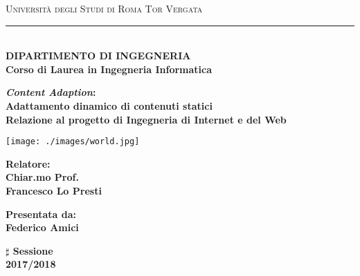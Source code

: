 \documentclass[paper=a4, oneside, fontsize=14pt, titlepage]{article}
\begin{document}
	\begin{titlepage}
		\begin{center}
			{{\Large{\textsc{Università degli Studi di Roma Tor Vergata}}}} \rule[0.1cm]{5.8cm}{0.5mm}\\
			{\small{\bf DIPARTIMENTO DI INGEGNERIA\\Corso di Laurea in Ingegneria Informatica}}
		\end{center}
		\vspace{15mm}
		\begin{center}
			{\LARGE{\bf\textit{ Content Adaption}:}}\\
			\vspace{3mm}
			{\LARGE{\bf Adattamento dinamico di contenuti statici}}\\
			\vspace{19mm} {\large{\bf Relazione al progetto di Ingegneria di Internet e del Web}}
		\end{center}
		\vspace{10mm}
		\begin{center}
			\texttt{[image: ./images/world.jpg]}
		\end{center}
		\vspace{10mm}
		\par
		\noindent
		\begin{minipage}[t]{0.47\textwidth}
			{\large{\bf Relatore:\\
					Chiar.mo Prof.\\
					Francesco Lo Presti}}
		\end{minipage}
		\hfill
		\begin{minipage}[t]{0.47\textwidth}\raggedleft
			{\large{\bf Presentata da:\\
					Federico Amici}}
		\end{minipage}
		\vspace{20mm}
		\begin{center}
			{\large{\bf $\sharp$ Sessione\\
					2017/2018 }}
		\end{center}
	\end{titlepage}
	\tableofcontents
	\newpage
	
\end{document}

